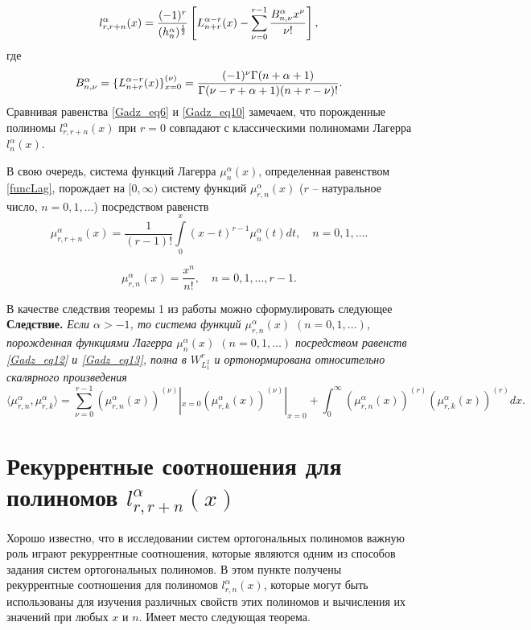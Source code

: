 \begin{equation*}
l_{r,r+n}^{\alpha}(x)=\frac{(-1)^r}{(h_n^\alpha)^{1\over2}}\left[L_{n+r}^{\alpha-r}(x)-
\sum_{\nu=0}^{r-1}{B_{n,\nu}^\alpha x^\nu\over\nu!}\right],
\end{equation*}
где
$$
B_{n,\nu}^\alpha=\{L_{n+r}^{\alpha-r}(x)\}^{(\nu)}_{x=0}=
{(-1)^\nu\Gamma(n+\alpha+1)\over\Gamma(\nu-r+ \alpha+1)(n+r-\nu)!}.
$$
Сравнивая равенства \eqref{Gadz_eq6} и \eqref{Gadz_eq10} замечаем, что порожденные полиномы $l_{r,r+n}^{\alpha}(x)$ при $r=0$ совпадают с классическими полиномами Лагерра $l_{n}^{\alpha}(x)$.

В свою очередь, система функций Лагерра $\mu_n^\alpha(x)$, определенная равенством \eqref{funcLag}, порождает на $[0, \infty)$ систему функций $\mu_{r,n}^\alpha(x)$ ($r$ -- натуральное число, $n=0, 1, \ldots$) посредством равенств
\begin{equation}\label{Gadz_eq12}
\mu_{r,r+n}^{\alpha}(x) =\frac{1}{(r-1)!}\int\limits_{0}^x(x-t)^{r-1}\mu_{n}^{\alpha}(t)dt, \quad n=0,1,\ldots.
\end{equation}

\begin{equation}\label{Gadz_eq13}
\mu_{r,n}^{\alpha}(x) =\frac{x^n}{n!}, \quad n=0,1,\ldots, r-1.
\end{equation}

В качестве следствия теоремы 1 из работы \cite{Gadz1} можно сформулировать следующее
\textbf{Следствие.}
\textsl{
Если $\alpha>-1$, то система функций $\mu_{r,n}^{\alpha}(x)$ $(n=0, 1,\ldots)$, порожденная функциями Лагерра $\mu_n^{\alpha}(x)$ $(n=0,1,\ldots)$ посредством равенств \eqref{Gadz_eq12} и \eqref{Gadz_eq13}, полна  в $W^r_{L^2_1}$ и ортонормирована относительно скалярного произведения
\begin{equation*}
\langle \mu_{r,n}^\alpha,\mu_{r,k}^\alpha\rangle=
\sum_{\nu=0}^{r-1}(\mu_{r,n}^\alpha(x))^{(\nu)}|_{x=0}(\mu_{r,k}^\alpha(x))^{(\nu)}|_{x=0}+
\int_{0}^{\infty} (\mu_{r,n}^\alpha(x))^{(r)}(\mu_{r,k}^\alpha(x))^{(r)} dx.
\end{equation*}
}

\section{Рекуррентные соотношения для полиномов $l_{r,r+n}^{\alpha}(x)$}
Хорошо известно, что в исследовании систем ортогональных полиномов важную роль играют рекуррентные соотношения, которые являются одним из способов задания систем ортогональных полиномов.
В этом пункте получены рекуррентные соотношения для полиномов $l_{r,n}^\alpha(x)$, которые могут быть использованы для изучения различных свойств этих полиномов и вычисления их значений при любых $x$ и $n$.
Имеет место следующая теорема.

